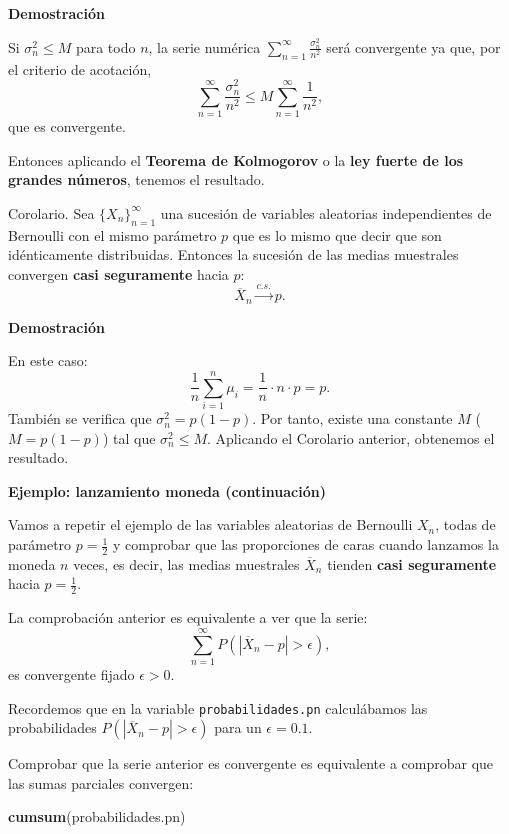 \documentclass[]{book}
\newenvironment{Shaded}{\begin{snugshade}}{\end{snugshade}}
\newcommand{\KeywordTok}[1]{\textcolor[rgb]{0.13,0.29,0.53}{\textbf{#1}}}
\newcommand{\NormalTok}[1]{#1}
\begin{document}
\textbf{Demostración}

Si \(\sigma_n^2\leq M\) para todo \(n\), la serie numérica \(\sum\limits_{n=1}^\infty \frac{\sigma_n^2}{n^2}\) será convergente ya que, por el criterio de acotación,
\[
\sum\limits_{n=1}^\infty \frac{\sigma_n^2}{n^2}\leq M\sum\limits_{n=1}^\infty \frac{1}{n^2},
\]
que es convergente.

Entonces aplicando el \textbf{Teorema de Kolmogorov} o la \textbf{ley fuerte de los grandes números}, tenemos el resultado.

 Corolario.
Sea \(\{X_n\}_{n=1}^\infty\) una sucesión de variables aleatorias independientes de Bernoulli con el mismo parámetro \(p\) que es lo mismo que decir que son idénticamente distribuidas.
Entonces la sucesión de las medias muestrales convergen \textbf{casi seguramente} hacia \(p\):
\[
\overline{X}_n \stackrel{c.s.}{\longrightarrow} p.
\]

\textbf{Demostración}

En este caso:
\[
\frac{1}{n}\sum_{i=1}^n \mu_i = \frac{1}{n}\cdot n\cdot p=p.
\]
También se verifica que \(\sigma_n^2 =p(1-p)\). Por tanto, existe una constante \(M\) (\(M=p(1-p)\)) tal que \(\sigma_n^2\leq M\). Aplicando el Corolario anterior, obtenemos el resultado.

\textbf{Ejemplo: lanzamiento moneda (continuación)}

Vamos a repetir el ejemplo de las variables aleatorias de Bernoulli \(X_n\), todas de parámetro \(p=\frac{1}{2}\) y comprobar que las proporciones de caras cuando lanzamos la moneda \(n\) veces, es decir, las medias muestrales \(\overline{X}_n\) tienden \textbf{casi seguramente} hacia \(p=\frac{1}{2}\).

La comprobación anterior es equivalente a ver que la serie:
\[
\sum_{n=1}^\infty P(|\overline{X}_n-p|>\epsilon),
\]
es convergente fijado \(\epsilon >0\).

Recordemos que en la variable \texttt{probabilidades.pn} calculábamos las probabilidades \(P(|\overline{X}_n-p|>\epsilon)\) para un \(\epsilon =0.1\).

Comprobar que la serie anterior es convergente es equivalente a comprobar que las sumas parciales convergen:

\begin{Shaded}
\begin{Highlighting}[]
\KeywordTok{cumsum}\NormalTok{(probabilidades.pn)}
\end{Highlighting}
\end{Shaded}
\end{document}
